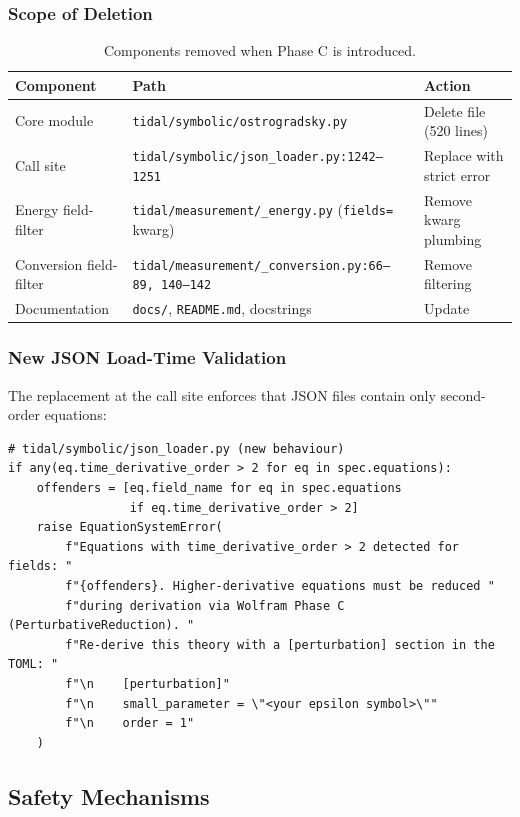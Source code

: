\subsubsection{Scope of Deletion}

\begin{table}[htbp]
\centering
\caption{Components removed when Phase C is introduced.}
\label{tab:prd-deletion-scope}
\begin{tabular}{@{}lll@{}}
\toprule
Component & Path & Action \\
\midrule
Core module & \texttt{tidal/symbolic/ostrogradsky.py} & Delete file (520 lines) \\
Call site & \texttt{tidal/symbolic/json\_loader.py:1242--1251} & Replace with strict error \\
Energy field-filter & \texttt{tidal/measurement/\_energy.py} (\texttt{fields=} kwarg) & Remove kwarg plumbing \\
Conversion field-filter & \texttt{tidal/measurement/\_conversion.py:66--89, 140--142} & Remove filtering \\
Documentation & \texttt{docs/}, \texttt{README.md}, docstrings & Update \\
\bottomrule
\end{tabular}
\end{table}

\subsubsection{New JSON Load-Time Validation}

The replacement at the call site enforces that JSON files contain only second-order equations:

\begin{verbatim}
# tidal/symbolic/json_loader.py (new behaviour)
if any(eq.time_derivative_order > 2 for eq in spec.equations):
    offenders = [eq.field_name for eq in spec.equations
                 if eq.time_derivative_order > 2]
    raise EquationSystemError(
        f"Equations with time_derivative_order > 2 detected for fields: "
        f"{offenders}. Higher-derivative equations must be reduced "
        f"during derivation via Wolfram Phase C (PerturbativeReduction). "
        f"Re-derive this theory with a [perturbation] section in the TOML: "
        f"\n    [perturbation]"
        f"\n    small_parameter = \"<your epsilon symbol>\""
        f"\n    order = 1"
    )
\end{verbatim}

\subsection{Safety Mechanisms}
\label{sec:prd-safety}

